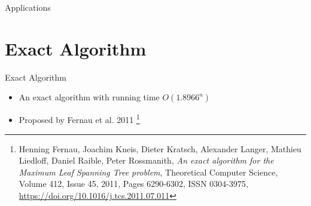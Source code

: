 \documentclass{beamer}
\begin{document}
\begin{frame}{Applications}


\end{frame}

\section{Exact Algorithm}


\begin{frame}{Exact Algorithm}
    \begin{itemize}
        \item An exact algorithm with running time $O({1.8966}^{n})$
        \item Proposed by Fernau et al. 2011 \footnote{Henning Fernau, Joachim Kneis, Dieter Kratsch, Alexander Langer, Mathieu Liedloff, Daniel Raible, Peter Rossmanith, \textit{An exact algorithm for the Maximum Leaf Spanning Tree problem}, Theoretical Computer Science, Volume 412, Issue 45, 2011, Pages 6290-6302, ISSN 0304-3975, \href{https://doi.org/10.1016/j.tcs.2011.07.011}{\url{https://doi.org/10.1016/j.tcs.2011.07.011}}}
    \end{itemize}
\end{frame}
\end{document}
